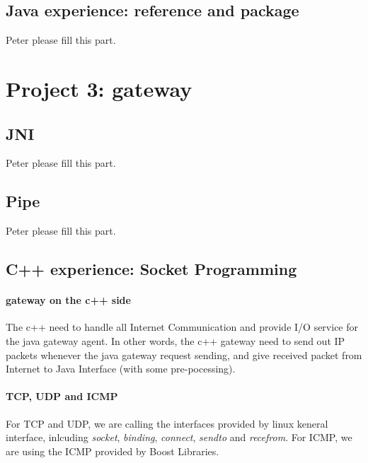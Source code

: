 \documentclass[conference,compsoc]{IEEEtran}
\begin{document}
	\subsection{Java experience: reference and package}
		Peter please fill this part.

\section{Project 3: gateway}

	
	\subsection{JNI}
		Peter please fill this part.
	
	\subsection{Pipe}
		Peter please fill this part.
		
	
	\subsection{C++ experience: Socket Programming}
		\paragraph{\textbf{gateway on the c++ side}}
		The c++ need to handle all Internet Communication and provide I/O service for the java gateway agent. In other words, the c++ gateway need to send out IP packets whenever the java gateway request sending, and give received packet from Internet to Java Interface (with some pre-pocessing).
		
		
		\paragraph{\textbf{TCP, UDP and ICMP}}
		For TCP and UDP, we are calling the interfaces provided by linux keneral interface, inlcuding \emph{socket}, \emph{binding}, \emph{connect}, \emph{sendto} and \emph{recefrom}. For ICMP, we are using the ICMP provided by Boost Libraries. 
\end{document}
